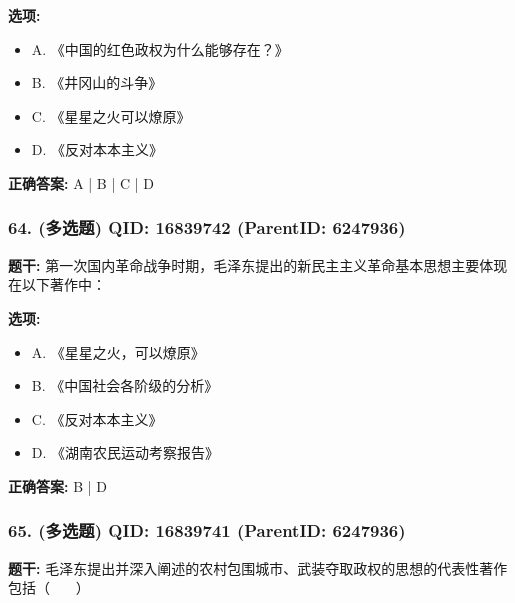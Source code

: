 \documentclass[12pt,UTF8]{ctexart}
\begin{document}
\textbf{选项:}
\begin{itemize}[leftmargin=*]

  \item A. 《中国的红色政权为什么能够存在？》

  \item B. 《井冈山的斗争》

  \item C. 《星星之火可以燎原》

  \item D. 《反对本本主义》

\end{itemize}

\textbf{正确答案:}
A | B | C | D

\vspace{0.3em}\hrulefill\vspace{0.7em}

\subsubsection*{64. (多选题) \small QID: 16839742 (ParentID: 6247936)}

\textbf{题干:}
第一次国内革命战争时期，毛泽东提出的新民主主义革命基本思想主要体现在以下著作中：



\textbf{选项:}
\begin{itemize}[leftmargin=*]

  \item A. 《星星之火，可以燎原》

  \item B. 《中国社会各阶级的分析》

  \item C. 《反对本本主义》

  \item D. 《湖南农民运动考察报告》

\end{itemize}

\textbf{正确答案:}
B | D

\vspace{0.3em}\hrulefill\vspace{0.7em}

\subsubsection*{65. (多选题) \small QID: 16839741 (ParentID: 6247936)}

\textbf{题干:}
毛泽东提出并深入阐述的农村包围城市、武装夺取政权的思想的代表性著作包括（    ）
\end{document}
